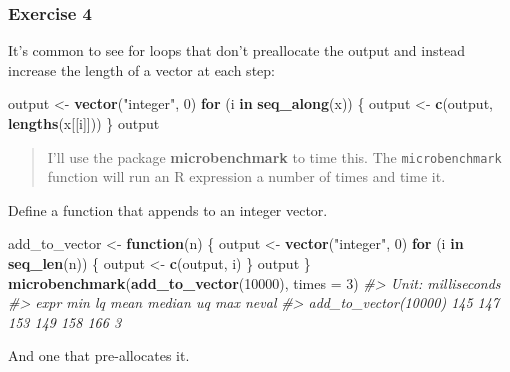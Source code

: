 \documentclass[]{book}
\newenvironment{Shaded}{\begin{snugshade}}{\end{snugshade}}
\newcommand{\CommentTok}[1]{\textcolor[rgb]{0.56,0.35,0.01}{\textit{#1}}}
\newcommand{\ControlFlowTok}[1]{\textcolor[rgb]{0.13,0.29,0.53}{\textbf{#1}}}
\newcommand{\DataTypeTok}[1]{\textcolor[rgb]{0.13,0.29,0.53}{#1}}
\newcommand{\DecValTok}[1]{\textcolor[rgb]{0.00,0.00,0.81}{#1}}
\newcommand{\KeywordTok}[1]{\textcolor[rgb]{0.13,0.29,0.53}{\textbf{#1}}}
\newcommand{\NormalTok}[1]{#1}
\newcommand{\StringTok}[1]{\textcolor[rgb]{0.31,0.60,0.02}{#1}}
\theoremstyle{definition}
\theoremstyle{definition}
\theoremstyle{definition}
\theoremstyle{remark}
\begin{document}
\hypertarget{exercise-4-30}{%
\subsubsection{Exercise 4}\label{exercise-4-30}}

It's common to see for loops that don't preallocate the output and
instead increase the length of a vector at each step:

\begin{Shaded}
\begin{Highlighting}[]
\NormalTok{output <-}\StringTok{ }\KeywordTok{vector}\NormalTok{(}\StringTok{"integer"}\NormalTok{, }\DecValTok{0}\NormalTok{)}
\ControlFlowTok{for}\NormalTok{ (i }\ControlFlowTok{in} \KeywordTok{seq_along}\NormalTok{(x)) \{}
\NormalTok{  output <-}\StringTok{ }\KeywordTok{c}\NormalTok{(output, }\KeywordTok{lengths}\NormalTok{(x[[i]]))}
\NormalTok{\}}
\NormalTok{output}
\end{Highlighting}
\end{Shaded}

\begin{quote}
I'll use the package \textbf{microbenchmark} to time this. The
\texttt{microbenchmark} function will run an R expression a number of
times and time it.
\end{quote}

Define a function that appends to an integer vector.

\begin{Shaded}
\begin{Highlighting}[]
\NormalTok{add_to_vector <-}\StringTok{ }\ControlFlowTok{function}\NormalTok{(n) \{}
\NormalTok{  output <-}\StringTok{ }\KeywordTok{vector}\NormalTok{(}\StringTok{"integer"}\NormalTok{, }\DecValTok{0}\NormalTok{)}
  \ControlFlowTok{for}\NormalTok{ (i }\ControlFlowTok{in} \KeywordTok{seq_len}\NormalTok{(n)) \{}
\NormalTok{    output <-}\StringTok{ }\KeywordTok{c}\NormalTok{(output, i)}
\NormalTok{  \}}
\NormalTok{  output  }
\NormalTok{\}}
\KeywordTok{microbenchmark}\NormalTok{(}\KeywordTok{add_to_vector}\NormalTok{(}\DecValTok{10000}\NormalTok{), }\DataTypeTok{times =} \DecValTok{3}\NormalTok{)}
\CommentTok{#> Unit: milliseconds}
\CommentTok{#>                  expr min  lq mean median  uq max neval}
\CommentTok{#>  add_to_vector(10000) 145 147  153    149 158 166     3}
\end{Highlighting}
\end{Shaded}

And one that pre-allocates it.
\end{document}
